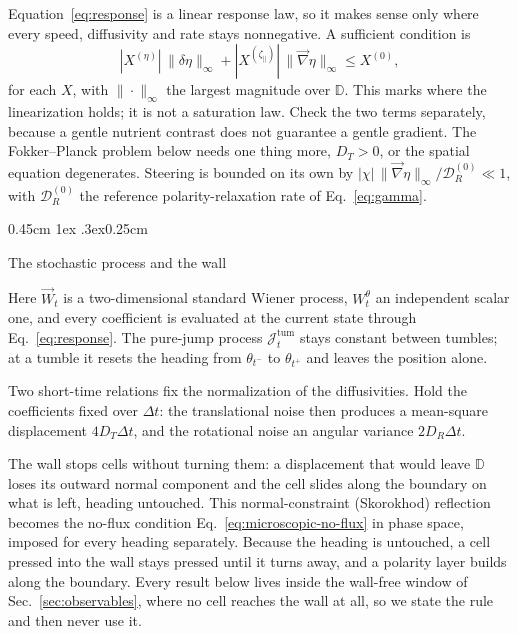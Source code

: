 \documentclass[
  reprint,
  superscriptaddress,
  amsmath,
  amssymb,
  aps,
  pre,
  nofootinbib,
  floatfix
]{revtex4-2}
\makeatletter
\newcommand{\Wv}{\vec W}
\newcommand{\grad}{\vec{\nabla}}
\newcommand{\Ud}{\mathbb D}
\newcommand{\DR}{\mathcal D_R^{(0)}}
\newcommand{\zp}{\zeta_\parallel}
\def\subsection{\@startsection{subsection}{2}{\z@}%
  {0.45cm \@plus1ex \@minus.3ex}{0.25cm}%
  {\normalfont\small\bfseries\raggedright}}%
\makeatother
\begin{document}
Equation~\eqref{eq:response} is a linear response law, so it makes sense only
where every speed, diffusivity and rate stays nonnegative.  A sufficient
condition is
\begin{equation}
  |X^{(\eta)}|\,\|\delta\eta\|_\infty
  +|X^{(\zp)}|\,\|\grad\eta\|_\infty\leq X^{(0)},
  \label{eq:admissible}
\end{equation}
for each $X$, with $\|\cdot\|_\infty$ the largest magnitude over $\Ud$.  This
marks where the linearization holds; it is not a saturation law.  Check the
two terms separately, because a gentle nutrient contrast does not guarantee a
gentle gradient.  The Fokker--Planck problem below needs one thing more,
$D_T>0$, or the spatial equation degenerates.  Steering is bounded on its own
by $|\chi|\,\|\grad\eta\|_\infty/\DR\ll1$, with $\DR$ the reference
polarity-relaxation rate of Eq.~\eqref{eq:gamma}.

\subsection{The stochastic process and the wall}

Here $\Wv_t$ is a two-dimensional standard Wiener process, $W_t^\theta$ an
independent scalar one, and every coefficient is evaluated at the current
state through Eq.~\eqref{eq:response}.  The pure-jump process
$\mathcal J_t^{\mathrm{tum}}$ stays constant between tumbles; at a tumble it
resets the heading from $\theta_{t^-}$ to $\theta_{t^+}$ and leaves the
position alone.

Two short-time relations fix the normalization of the diffusivities.  Hold the
coefficients fixed over $\Delta t$: the translational noise then produces a
mean-square displacement $4D_T\Delta t$, and the rotational noise an angular
variance $2D_R\Delta t$.

The wall stops cells without turning them: a displacement that would leave
$\Ud$ loses its outward normal component and the cell slides along the
boundary on what is left, heading untouched.  This normal-constraint
(Skorokhod) reflection becomes the no-flux condition
Eq.~\eqref{eq:microscopic-no-flux} in phase space, imposed for every heading
separately.  Because the heading is untouched, a cell pressed into the wall
stays pressed until it turns away, and a polarity layer builds along the
boundary.  Every result below lives inside the wall-free window of
Sec.~\ref{sec:observables}, where no cell reaches the wall at all, so we
state the rule and then never use it.
\end{document}
